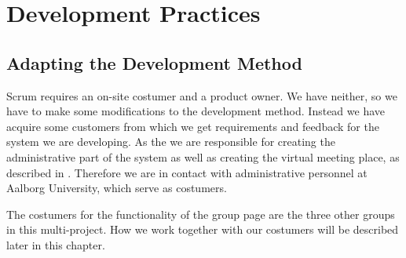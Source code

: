 \chapter{Development Practices} %
\label{sec:developmentpractice}



\section{Adapting the Development Method}



Scrum requires an on-site costumer and a product owner.
We have neither, so we have to make some modifications to the development method.
Instead we have acquire some customers from which we get requirements and feedback for the system we are developing.
As the \groupname{} we are responsible for creating the administrative part of the system as well as creating the virtual meeting place, as described in .
Therefore we are in contact with administrative personnel at Aalborg University, which serve as costumers.

The costumers for the functionality of the group page are the three other groups in this multi-project.
How we work together with our costumers will be described later in this chapter.

